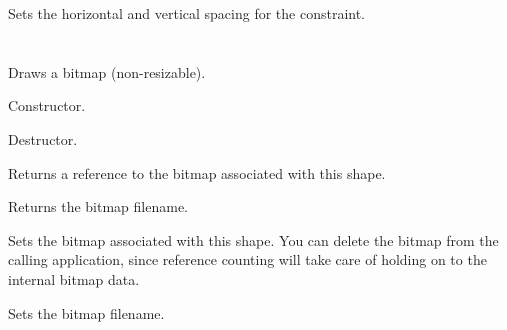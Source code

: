 
Sets the horizontal and vertical spacing for the constraint.

\section{}\label{wxbitmapshape}

Draws a bitmap (non-resizable).






Constructor.



Destructor.



Returns a reference to the bitmap associated with this shape.



Returns the bitmap filename.



Sets the bitmap associated with this shape. You can delete the bitmap
from the calling application, since reference counting will take care of
holding on to the internal bitmap data.



Sets the bitmap filename.

\section{}\label{wxdiagram}

